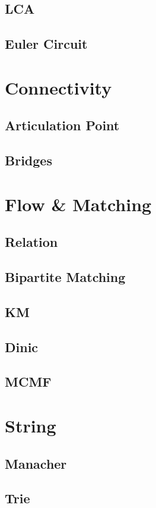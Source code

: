     \subsection{LCA}
        
    \subsection{Euler Circuit}
        

\section{Connectivity}
    \subsection{Articulation Point}
        
    \subsection{Bridges}
        

\section{Flow \& Matching}
    \subsection{Relation}
        
    \subsection{Bipartite Matching}
        
    \subsection{KM}
        
    \subsection{Dinic}
        
    \subsection{MCMF}
        

\section{String}
    \subsection{Manacher}
        
    \subsection{Trie}
        

